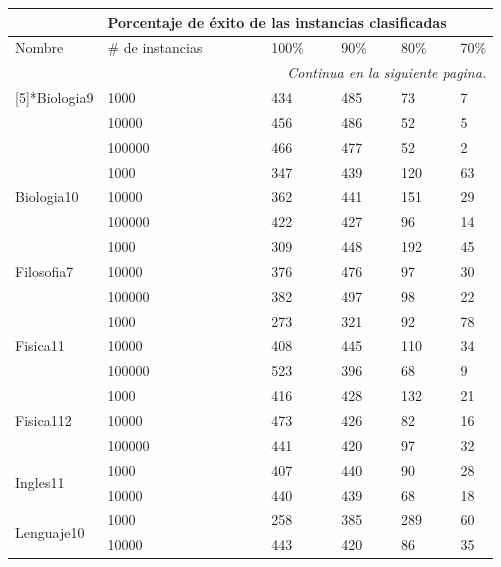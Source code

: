 \begin{longtable}{|p{3cm}|p{3cm}|p{2cm}|p{2cm}|p{2cm}|p{2cm}|}
\hline
	\rowcolor[gray]{0.5} 
	\multicolumn{2}{|c|}{Vista minable} &
	\multicolumn{4}{|c|}{Porcentaje de éxito de las instancias clasificadas}\\
	\hline
	\rowcolor[gray]{0.9} 
	Nombre & \# de instancias & 100\% & 90\% & 80\% & 70\%\\
	\hline
	\endhead
	\hline
	\multicolumn{6}{r}{\textit{Continua en la siguiente pagina.}} \\
	\endfoot
	\endlastfoot
\multirow{3}[5]{*}{Biologia9} & 1000  & 434   & 485   & 73    & 7 \\
\cline{2-6}      & 10000 & 456   & 486   & 52    & 5 \\
\cline{2-6}      & 100000 & 466   & 477   & 52    & 2 \\
\hline
\multirow{3}[6]{*}{Biologia10} & 1000  & 347   & 439   & 120   & 63 \\
\cline{2-6}      & 10000 & 362   & 441   & 151   & 29 \\
\cline{2-6}      & 100000 & 422   & 427   & 96    & 14 \\
\hline
\multirow{3}[6]{*}{Filosofia7} & 1000  & 309   & 448   & 192   & 45 \\
\cline{2-6}      & 10000 & 376   & 476   & 97    & 30 \\
\cline{2-6}      & 100000 & 382   & 497   & 98    & 22 \\
\hline
\multirow{3}[6]{*}{Fisica11} & 1000  & 273   & 321   & 92    & 78 \\
\cline{2-6}      & 10000 & 408   & 445   & 110   & 34 \\
\cline{2-6}      & 100000 & 523   & 396   & 68    & 9 \\
\hline
\multirow{3}[6]{*}{Fisica112} & 1000  & 416   & 428   & 132   & 21 \\
\cline{2-6}      & 10000 & 473   & 426   & 82    & 16 \\
\cline{2-6}      & 100000 & 441   & 420   & 97    & 32 \\
\hline
\multirow{2}[4]{*}{Ingles11} & 1000  & 407   & 440   & 90    & 28 \\
\cline{2-6}      & 10000 & 440   & 439   & 68    & 18 \\
\hline
\multirow{3}[6]{*}{Lenguaje10} & 1000  & 258   & 385   & 289   & 60 \\
\cline{2-6}      & 10000 & 443   & 420   & 86    & 35 \\

\end{longtable}

